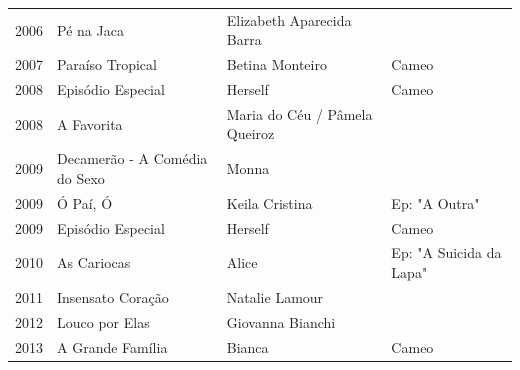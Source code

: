 \documentclass{article}
\begin{document}
\begin{tabular}{llll}
2006 & Pé na Jaca & Elizabeth Aparecida Barra &  \\
2007 & Paraíso Tropical & Betina Monteiro & Cameo \\
2008 & Episódio Especial & Herself & Cameo \\
2008 & A Favorita & Maria do Céu / Pâmela Queiroz &  \\
2009 & Decamerão - A Comédia do Sexo & Monna &  \\
2009 & Ó Paí, Ó & Keila Cristina & Ep: "A Outra" \\
2009 & Episódio Especial & Herself & Cameo \\
2010 & As Cariocas & Alice & Ep: "A Suicida da Lapa" \\
2011 & Insensato Coração & Natalie Lamour &  \\
2012 & Louco por Elas & Giovanna Bianchi &  \\
2013 & A Grande Família & Bianca & Cameo \\
\bottomrule
\end{tabular}
\end{document}
